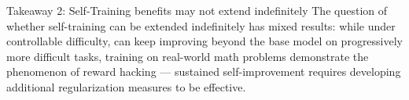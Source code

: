 \begin{AIbox}{Takeaway 2: Self-Training benefits may not extend indefinitely}
The question of whether self-training can be extended indefinitely has mixed results: while under controllable difficulty, \algo{} can keep improving beyond the base model on progressively more difficult tasks, training on real-world math problems demonstrate the phenomenon of reward hacking --- sustained self-improvement requires developing additional regularization measures to be effective.
\end{AIbox}
\vspace{-0.1cm}













    
    









